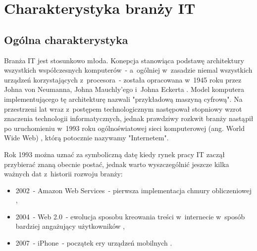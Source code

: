 

\chapter{Charakterystyka branży IT}\label{ch:it-sector}


\section{Ogólna charakterystyka}\label{sec:it-industry-summary}

Branża IT jest stosunkowo młoda.
Konepcja stanowiąca podstawę architektury wszystkich współczesnych komputerów~- a~ogólniej w~zasadzie niemal wszystkich urządzeń korzystających z~procesora~- została opracowana w~1945 roku przez Johna von Neumanna, Johna Mauchly’ego i~Johna Eckerta \cite{von-neumann-2020}.
Model komputera implementującego tę architekturę nazwali "przykładową maszyną cyfrową".
Na przestrzeni lat wraz z~postępem technologicznym następował stopniowy wzrot znaczenia technologii informatycznych,
jednak prawdziwy rozkwit branży nastąpił po uruchomieniu w~1993 roku ogólnoświatowej sieci komputerowej (ang. World Wide Web) \cite{rangarajan-2014}, którą potocznie nazywamy "Internetem".

Rok 1993 można uznać za symboliczną datę kiedy rynek pracy IT zaczął przybierać znaną obecnie postać, jednak warto wyszczególnić jeszcze kilka ważnych dat z~historii rozwoju branży:
\begin{itemize}
    \item 2002~- Amazon Web Services~- pierwsza implementacja chmury obliczeniowej \cite{aws-2017},
    \item 2004~- Web 2.0~- ewolucja sposobu kreowania treści w~internecie w~sposób bardziej angażujący użytkowników \cite{web-2.0-2007},
    \item 2007~- iPhone~- początek ery urządzeń mobilnych \cite{iphone-2018}.
\end{itemize}

